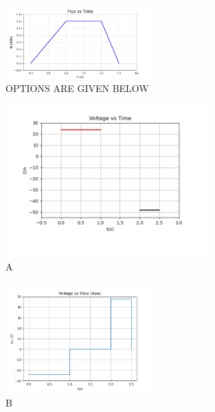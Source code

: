 \documentclass{article}
\begin{document}
\begin{enumerate}
\begin{figure}[h!]
      \label{fig:your_label}
    \end{figure}

    \begin{figure}[h!]
    \centering
      \hspace{-1cm}
      \includegraphics[width=0.5\textwidth]{Figure_4.png}
      \caption{OPTIONS ARE GIVEN BELOW}
      \label{fig:your_label}
    \end{figure}


    \begin{figure}[h!]
    \centering
      \hspace{-1cm}
      \includegraphics[width=0.7\textwidth]{Figure_6.png}
      \caption{A}
      \label{fig:your_label}
    \end{figure}

   \begin{figure}[h!]
    \centering
      \hspace{-1cm}
      \includegraphics[width=0.5\textwidth]{Figure_7.png}
      \caption{B}
      \label{fig:your_label}
    \end{figure}


\end{enumerate}
\end{document}
